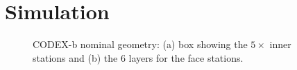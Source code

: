 \section{Simulation}
\label{sec:Simulation}

\begin{figure}
\centering
{}
\caption{\label{fig:nom_geo_cartoon}
    CODEX-b nominal geometry: (a) box showing the $5\times$ inner stations and (b) the 6 layers for the face stations. 
}
\end{figure}


